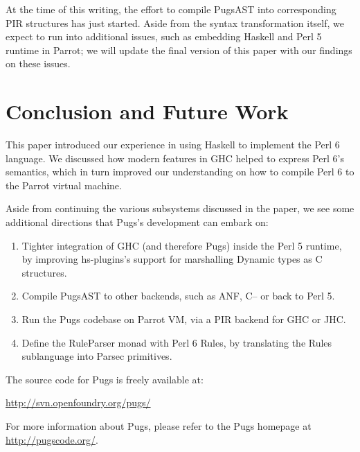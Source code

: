 \documentclass[]{sigplanconf}
\begin{document}
At the time of this writing, the effort to compile PugsAST into corresponding
PIR structures has just started.  Aside from the syntax transformation itself,
we expect to run into additional issues, such as embedding Haskell and Perl 5
runtime in Parrot; we will update the final version of this paper with our
findings on these issues.

\section{Conclusion and Future Work}
\label{sec:ConclusionandFutureWork}

This paper introduced our experience in using Haskell to implement the Perl 6
language.  We discussed how modern features in GHC helped to express Perl 6's
semantics, which in turn improved our understanding on how to compile Perl 6
to the Parrot virtual machine.

Aside from continuing the various subsystems discussed in the paper, we see
some additional directions that Pugs's development can embark on: 

\begin{enumerate}
\item Tighter integration of GHC (and therefore Pugs) inside the Perl 5
runtime, by improving hs-plugins's support for marshalling Dynamic types as
C structures.
\item Compile PugsAST to other backends, such as ANF, C-- or back to Perl 5.
\item Run the Pugs codebase on Parrot VM, via a PIR backend for GHC or JHC.
\item Define the RuleParser monad with Perl 6 Rules, by translating the Rules
sublanguage into Parsec primitives.
\end{enumerate}

The source code for Pugs is freely available at:

\begin{center}
\url{http://svn.openfoundry.org/pugs/}
\end{center}

For more information about Pugs, please refer to the Pugs homepage at
\url{http://pugscode.org/}.



\acks
\end{document}

